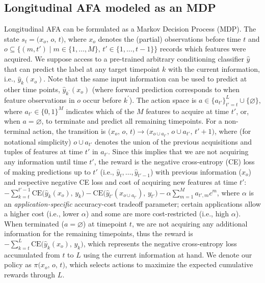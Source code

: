 \subsection{Longitudinal AFA modeled as an MDP}


Longitudinal AFA can be formulated as a Markov Decision Process (MDP). The state $s_t = \bigl({x}_{o},\, o,\,  t\bigr)$, where ${x}_{o}$ denotes the (partial) observations before time $t$ and $o \subseteq \{(m, t') \mid m \in \{1, \ldots, M\}, \, t' \in \{1, \ldots,  t-1\}\}$ records which features were acquired. 
We suppose access to a pre-trained arbitrary conditioning classifier $\hat{y}$ ~\citep{shim2018joint, li2021active} that can predict the label at any target timepoint $k$ with the current information, i.e., $\hat{y}_k(x_o)$. Note that the same input information can be used to predict at other time points, $\hat{y}_{k^\prime}(x_o)$ (where forward prediction corresponds to when feature observations in $o$ occur before $k^\prime$).
The action space is $a \in \{a_{t'}\}_{t'=t}^L \cup \{\varnothing\}$, where $a_{t'} \in \{0,1\}^M$ indicates which of the $M$ features to acquire at time $t'$, or, when $a = \varnothing$, to terminate and predict all remaining timepoints. For a non-terminal action, the transition is $\bigl({x}_{o},\, o, \, t\bigr) \rightarrow \bigl({x}_{o \cup a_{t'}},\, o \cup a_{t'},\, t'+1 \bigr)$, where (for notational simplicity) $o \cup a_{t'}$ denotes the union of the previous acquisitions and tuples of features at time $t'$ in $a_{t'}$.
Since this implies that we are not acquiring any information until time $t'$, the reward is the negative cross-entropy (CE) loss of making predictions up to $t'$ (i.e., $\hat{y}_{t}, \ldots, \hat{y}_{t'-1}$) with previous information (${x}_{o}$) and respective negative CE loss and cost of acquiring new features at time $t'$: 
$-\sum_{k=t}^{t'-1} \mathrm{CE}(\hat{y}_k({x}_{o}),\,y_{k}\bigr) - \mathrm{CE}(\hat{y}_{t'}({x}_{o \cup a_{t'}}),\,y_{t'}\bigr) -\alpha\sum_{m=1}^M a_{t',m}c^m$, 
where $\alpha$ is an \emph{application-specific} accuracy-cost tradeoff parameter; certain applications allow a higher cost (i.e., lower $\alpha$) and some are more cost-restricted (i.e., high $\alpha$). When terminated ($a = \varnothing$) at timepoint $t$, we are not acquiring any additional information for the remaining timepoints, thus the reward is $-\sum_{k=t}^L \mathrm{CE}(\hat{y}_k({x}_{o}),\,y_{k}\bigr)$, which represents the negative cross-entropy loss accumulated from $t$ to $L$ using the current information at hand.
We denote our policy as $\pi\bigl({x}_{o},\, o,\, t\bigr)$, which selects 
actions to maximize the expected cumulative rewards through $L$.


